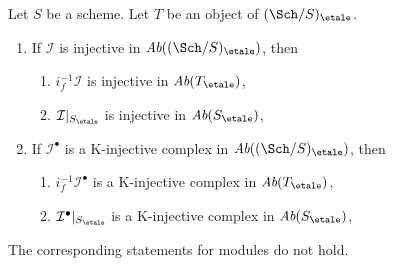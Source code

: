 \begin{lemma}
\label{lemma-compare-injectives}
Let $S$ be a scheme. Let $T$ be an object of $(\Sch/S)_\etale$.
\begin{enumerate}
\item If $\mathcal{I}$ is injective in $\textit{Ab}((\Sch/S)_\etale)$, then
\begin{enumerate}
\item $i_f^{-1}\mathcal{I}$ is injective in $\textit{Ab}(T_\etale)$,
\item $\mathcal{I}|_{S_\etale}$ is injective in $\textit{Ab}(S_\etale)$,
\end{enumerate}
\item If $\mathcal{I}^\bullet$ is a K-injective complex
in $\textit{Ab}((\Sch/S)_\etale)$, then
\begin{enumerate}
\item $i_f^{-1}\mathcal{I}^\bullet$ is a K-injective complex in
$\textit{Ab}(T_\etale)$,
\item $\mathcal{I}^\bullet|_{S_\etale}$ is a K-injective complex in
$\textit{Ab}(S_\etale)$,
\end{enumerate}
\end{enumerate}
The corresponding statements for modules do not hold.
\end{lemma}

